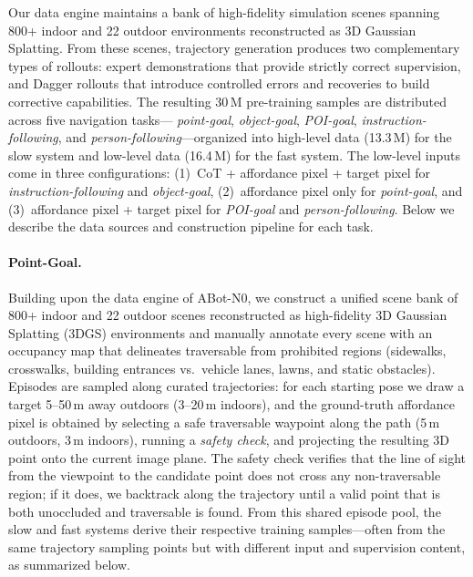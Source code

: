 Our data engine maintains a bank of high-fidelity simulation
scenes spanning 800+ indoor and 22 outdoor environments reconstructed
as 3D Gaussian Splatting. From these scenes, trajectory generation
 produces two complementary types of rollouts: expert
demonstrations that provide strictly correct supervision, and Dagger
rollouts that introduce controlled errors and recoveries to build
corrective capabilities.
The resulting 30\,M pre-training samples  are distributed
across five navigation tasks--- \textit{point-goal},
\textit{object-goal}, \textit{POI-goal}, \textit{instruction-following}, and \textit{person-following}---organized into
high-level data (13.3\,M) for the slow system and low-level data
(16.4\,M) for the fast system. The low-level inputs come in three
configurations:
(1)~CoT + affordance pixel + target pixel for \textit{instruction-following}
and \textit{object-goal},
(2)~affordance pixel only for \textit{point-goal}, and
(3)~affordance pixel + target pixel for \textit{POI-goal} and \textit{person-following}.
Below we describe the data sources and construction pipeline for each task.

\paragraph{Point-Goal.}
Building upon the data engine of ABot-N0, we construct a unified scene bank of 800+ indoor and 22 outdoor scenes
reconstructed as high-fidelity 3D Gaussian Splatting (3DGS)
environments and manually annotate every scene with an occupancy map
that delineates traversable from prohibited regions (sidewalks,
crosswalks, building entrances vs.\ vehicle lanes, lawns, and static
obstacles). Episodes are sampled along curated trajectories: for each
starting pose we draw a target 5--50\,m away outdoors (3--20\,m
indoors), and the ground-truth affordance pixel is obtained by
selecting a safe traversable waypoint along the path (5\,m outdoors,
3\,m indoors), running a \textit{safety check}, and projecting
the resulting 3D point onto the current image plane. The safety check
verifies that the line of sight from the viewpoint to the candidate
point does not cross any non-traversable region; if it does, we
backtrack along the trajectory until a valid point that is both
unoccluded and traversable is found. From this shared
episode pool, the slow and fast systems derive their respective
training samples---often from the same trajectory sampling points but
with different input and supervision content, as summarized below.

